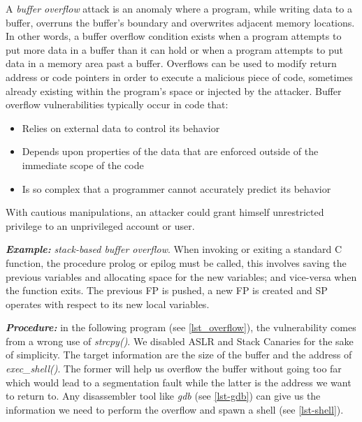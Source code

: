 \documentclass[10pt,twocolumn]{article}
\begin{document}


A \textit{buffer overflow} attack is an anomaly where a
program, while writing data to a buffer, overruns the buffer's boundary and
overwrites adjacent memory locations. In other words, a buffer overflow condition exists when a program attempts to put more data in a buffer than it can
hold or when a program attempts to put data in a memory area past a
buffer. Overflows can be used to modify return address or code pointers in order
to execute a malicious piece of code, sometimes already existing within the
program's space or injected by the attacker. Buffer overflow vulnerabilities typically occur in code that:
\begin{itemize}
    \item Relies on external data to control its behavior
    \item Depends upon properties of the data that are enforced outside of the immediate scope of the code
    \item Is so complex that a programmer cannot accurately predict its behavior
\end{itemize}

With cautious manipulations, an attacker could grant himself unrestricted
privilege to an unprivileged account or user.

\textbf{\textit{Example:}} \textit{stack-based buffer
overflow}\cite{one_stacksmashing_1996}. When invoking or exiting a standard C
function, the procedure prolog or epilog must be called, this involves saving
the previous variables and allocating space for the new variables; and
vice-versa when the function exits. The previous FP is pushed, a new FP is
created and SP operates with respect to its new local variables.

\textbf{\textit{Procedure:}} in the following program (see
\autoref{lst_overflow}), the
vulnerability comes from a wrong use of \textit{strcpy()}. We disabled ASLR and
Stack Canaries for the sake of simplicity. The target information are the size
of the buffer and the address of \textit{exec\_shell()}. The former will help
us overflow the buffer without going too far which would lead to a segmentation
fault while the latter is the address we want to return to. Any disassembler
tool like \textit{gdb} (see \autoref{lst-gdb}) can give us the information we need to perform the
overflow and spawn a shell (see \autoref{lst-shell}).
\end{document}
